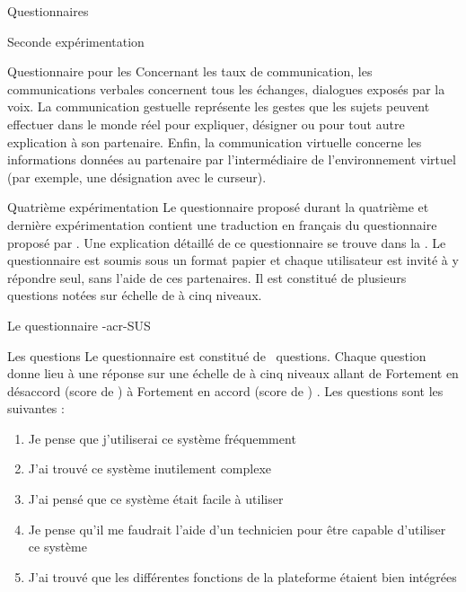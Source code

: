 \documentclass[myfrancais,ngerman,english,french]{mythesis}
\begin{document}
\begin{mychapter}{Questionnaires}
\begin{mysection}{Seconde expérimentation}
\begin{mysubsection}{Questionnaire pour les }
				Concernant les taux de communication, les communications verbales concernent tous les échanges, dialogues exposés par la voix.
				La communication gestuelle représente les gestes que les sujets peuvent effectuer dans le monde réel pour expliquer, désigner ou pour tout autre explication à son partenaire.
				Enfin, la communication virtuelle concerne les informations données au partenaire par l'intermédiaire de l'environnement virtuel (par exemple, une désignation avec le curseur).
			\end{mysubsection}
		\end{mysection}
		\begin{mysection}{Quatrième expérimentation}
			Le questionnaire proposé durant la quatrième et dernière expérimentation contient une traduction en français du questionnaire  proposé par .
			Une explication détaillé de ce questionnaire se trouve dans la .
			Le questionnaire est soumis sous un format papier et chaque utilisateur est invité à y répondre seul, sans l'aide de ces partenaires.
			Il est constitué de plusieurs questions notées sur échelle de  à cinq niveaux.
			\begin{mysubsection}{Le questionnaire \myacronl-{acr-SUS}}
				\begin{mysubsubsection}{Les questions}
					Le questionnaire  est constitué de ~questions.
					Chaque question donne lieu à une réponse sur une échelle de  à cinq niveaux allant de \og Fortement en désaccord (score de ) \fg à \og Fortement en accord (score de ) \fg.
					Les questions sont les suivantes :
					\begin{enumerate}[label={Q\arabic*.},ref={Q\arabic*}]
						\item Je pense que j'utiliserai ce système fréquemment
						\item J'ai trouvé ce système inutilement complexe
						\item J'ai pensé que ce système était facile à utiliser
						\item Je pense qu'il me faudrait l'aide d'un technicien pour être capable d'utiliser ce système
						\item J'ai trouvé que les différentes fonctions de la plateforme étaient bien intégrées

\end{enumerate}
\end{mysubsubsection}
\end{mysubsection}
\end{mysection}
\end{mychapter}
\end{document}
